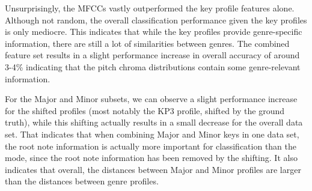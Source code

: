 \documentclass{article}
\begin{document}
\begin{table}
\begin{center}
    \caption{Classification accuracy for different feature combinations.}
    \label{tab:accuracyPC}
  \end{center}
\end{table}

Unsurprisingly, the MFCCs vastly outperformed the key profile features alone. Although not random, the overall classification performance given the key profiles is only mediocre. This indicates that while the key profiles provide genre-specific information, there are still a lot of similarities between genres. The combined feature set results in a slight performance increase in overall accuracy of around 3-4\% indicating that the pitch chroma distributions contain some genre-relevant information. 

For the Major and Minor subsets, we can observe a slight performance increase for the shifted profiles (most notably the KP3 profile, shifted by the ground truth), while this shifting actually results in a small decrease for the overall data set. That indicates that when combining Major and Minor keys in one data set, the root note information is actually more important for classification than the mode, since the root note information has been removed by the shifting. It also indicates that overall, the distances between Major and Minor profiles are larger than the distances between genre profiles. 
\end{document}
